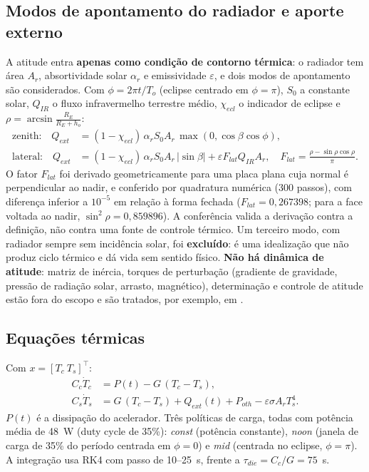 \documentclass[12pt,a4paper]{article}
\begin{document}
\subsection{Modos de apontamento do radiador e aporte externo}
A atitude entra \textbf{apenas como condição de contorno térmica}: o radiador
tem área $A_r$, absortividade solar $\alpha_r$ e emissividade $\varepsilon$, e
dois modos de apontamento são considerados. Com $\phi=2\pi t/T_o$ (eclipse
centrado em $\phi=\pi$), $S_0$ a constante solar, $Q_{IR}$ o fluxo infravermelho
terrestre médio, $\chi_{ecl}$ o indicador de eclipse e
$\rho=\arcsin\frac{R_E}{R_E+h_o}$:
\begin{align}
\text{zenith:}\quad Q_{ext}&=(1-\chi_{ecl})\,\alpha_rS_0A_r\,\max(0,\cos\beta\cos\phi),
\label{eq:zen}\\
\text{lateral:}\quad Q_{ext}&=(1-\chi_{ecl})\,\alpha_rS_0A_r\,|\sin\beta|
+\varepsilon F_{lat}Q_{IR}A_r,\quad F_{lat}=\frac{\rho-\sin\rho\cos\rho}{\pi}.
\label{eq:lat}
\end{align}
O fator $F_{lat}$ foi derivado geometricamente para uma placa plana cuja normal
é perpendicular ao nadir, e conferido por quadratura numérica (300 passos), com
diferença inferior a $10^{-5}$ em relação à forma fechada
($F_{lat}=0{,}267398$; para a face voltada ao nadir, $\sin^2\rho=0{,}859896$).
A conferência valida a derivação contra a definição, não contra uma fonte de
controle térmico. Um terceiro modo, com radiador sempre sem incidência solar,
foi \textbf{excluído}: é uma idealização que não produz ciclo térmico e dá vida
sem sentido físico. \textbf{Não há dinâmica de atitude}: matriz de inércia,
torques de perturbação (gradiente de gravidade, pressão de radiação solar,
arrasto, magnético), determinação e controle de atitude estão fora do escopo e
são tratados, por exemplo, em \cite{markley2014}.

\subsection{Equações térmicas}
Com $x=[T_c\ T_s]^\top$:
\begin{align}
C_c\dot T_c&=P(t)-G\,(T_c-T_s), \label{eq:tc}\\
C_s\dot T_s&=G\,(T_c-T_s)+Q_{ext}(t)+P_{oth}-\varepsilon\sigma A_rT_s^4. \label{eq:ts}
\end{align}
$P(t)$ é a dissipação do acelerador. Três políticas de carga, todas com
potência média de 48~W (duty cycle de 35\%): \emph{const} (potência
constante), \emph{noon} (janela de carga de 35\% do período centrada em
$\phi=0$) e \emph{mid} (centrada no eclipse, $\phi=\pi$). A integração usa RK4
com passo de 10--25~s, frente a $\tau_{die}=C_c/G=75$~s.
\end{document}
